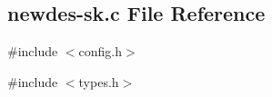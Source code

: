 \subsection{newdes-\/sk.c File Reference}
\label{newdes-sk_8c}
{\ttfamily \#include $<$config.h$>$}\par
{\ttfamily \#include $<$types.h$>$}\par
